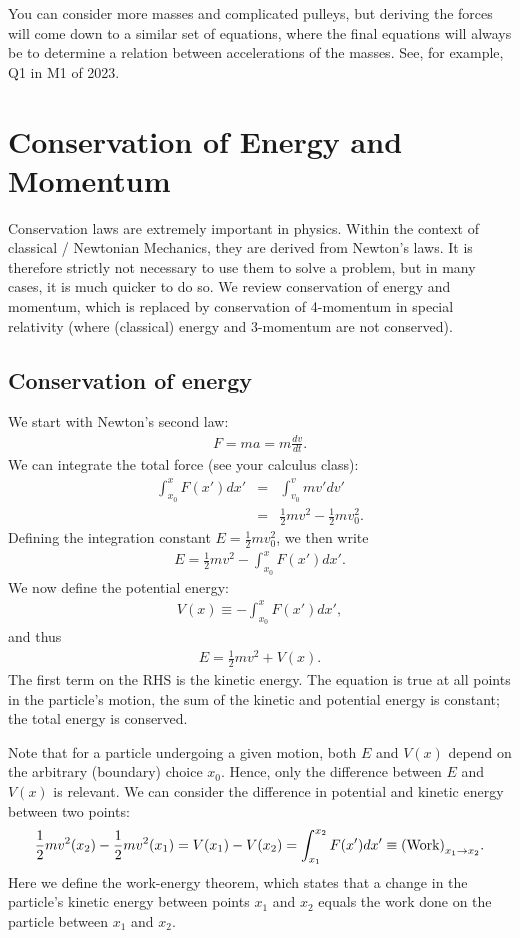 \documentclass[12pt]{article}
\newcommand{\be}{\begin{eqnarray}}
\newcommand{\ee}{\end{eqnarray}}
\begin{document}
You can consider more masses and complicated pulleys, but deriving the forces will come down to a similar set of equations, where the final equations will always be to determine a relation between accelerations of the masses. See, for example, Q1 in M1 of 2023. 

\section{Conservation of Energy and Momentum}

Conservation laws are extremely important in physics. Within the context of classical / Newtonian Mechanics, they are derived from Newton's laws. It is therefore strictly not necessary to use them to solve a problem, but in many cases, it is much quicker to do so. We review conservation of energy and momentum, which is replaced by conservation of 4-momentum in special relativity (where (classical) energy and 3-momentum are not conserved). 

\subsection{Conservation of energy}

We start with Newton's second law:
\be
F = m a = m \frac{dv }{dt}. 
\ee
We can integrate the total force (see your calculus class):
\be
\int_{x_0}^{x} F(x') dx' &= &\int_{v_0}^{v} m v' dv' \nonumber \\
&= &\frac{1}{2} mv^2 - \frac{1}{2} m v_0^2.  
\ee
Defining the integration constant $E=\frac{1}{2} m v_0^2$, we then write
\be
E = \frac{1}{2} m v^2 - \int_{x_0}^{x} F(x') dx'.
\ee
We now define the potential energy:
\be
V(x) \equiv -\int_{x_0}^{x} F(x') dx',
\ee
and thus
\be
E = \frac{1}{2} m v^2 + V(x).
\ee
The first term on the RHS is the kinetic energy. The equation is true at all points in the particle's motion, the sum of the kinetic and potential energy is constant; the total energy is conserved.  

Note that for a particle undergoing a given motion, both $E$ and $V(x)$ depend on the arbitrary (boundary) choice $x_0$. Hence, only the difference between $E$ and $V(x)$ is relevant. We can consider the difference in potential and kinetic energy between two points:
\be
\frac{1}{2} mv^2(x_2) - \frac{1}{2} mv^2(x_1) = V(x_1) - V(x_2) = \int_{x_1}^{x_2} F(x') dx' \equiv {\rm (Work)}_{x_1 \rightarrow x_2}.
\ee
Here we define the work-energy theorem, which states that a change in the particle's kinetic energy between points $x_1$ and $x_2$ equals the work done on the particle between $x_1$ and $x_2$.
\end{document}
